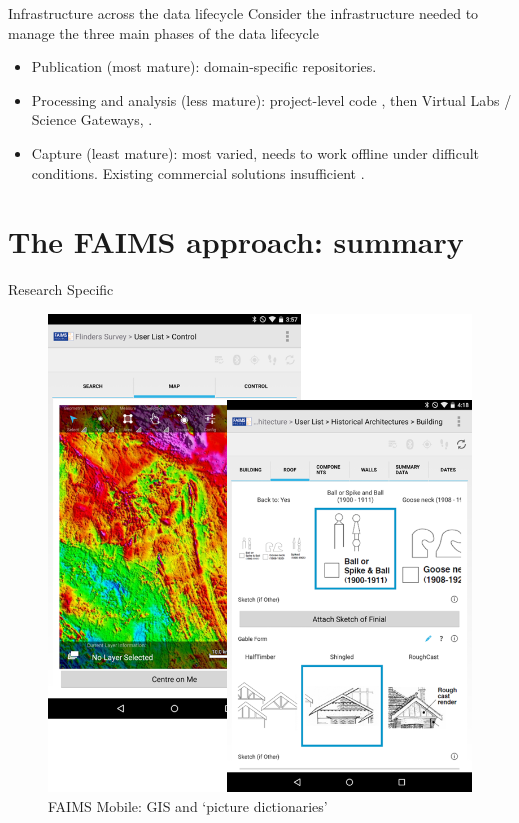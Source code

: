 \documentclass[aspectratio=169, 12pt]{beamer} %
\begin{document}
\begin{frame}{Infrastructure across the data lifecycle}
    Consider the infrastructure needed to manage the three main phases of the data lifecycle
    \begin{itemize}[label=\textbullet]
        \item Publication (most mature): domain-specific repositories.
        \item Processing and analysis (less mature): project-level code \cite{Stewart_Lowndes2017-lj}, then Virtual Labs / Science Gateways, \cite{Alveo2019-tk}.
        \item Capture (least mature): most varied, needs to work offline under difficult conditions. Existing commercial solutions insufficient \cite{Bureau_of_Reclamation2017-xl}.
    \end{itemize}
\end{frame}



\section{The FAIMS approach: summary}

\begin{frame}{Research Specific}
 \begin{figure}[H]
    \centering
        \includegraphics[height=.75\textheight]{figures/FAIMS-screenshots.png}
        \caption{FAIMS Mobile: GIS and `picture dictionaries'}
        \label{fig:FAIMS-mobile-screenshots}
 \end{figure}
\end{frame}
\end{document}
